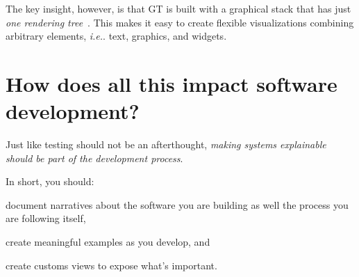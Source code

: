 \documentclass[conference]{IEEEtran}
\newcommand\on[1]{\nbc{ON}{#1}{red}} %
\newcommand\tg[1]{\nbc{TG}{#1}{orange}} %
\newcommand{\ie}{\emph{i.e.}\xspace}
\begin{document}
The key insight, however, is that GT is built with a graphical stack that has just \emph{one rendering tree}~\cite{Girb20a}.
This makes it easy to create flexible visualizations combining arbitrary elements, \ie. text, graphics, and widgets.



\section*{How does all this impact software development?}

Just like testing should not be an afterthought, \emph{making systems explainable should be part of the development process}.

In short, you should:
\begin{inparaenum}[(i)]
\item document narratives about the software you are building as well the process you are following itself,
\item create meaningful examples as you develop, and
\item create customs views to expose what's important.
\end{inparaenum}
\end{document}
